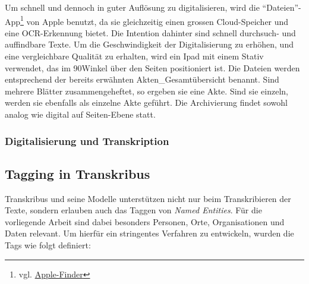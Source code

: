 \documentclass[12pt, a4paper, ngerman, bidi=default]{article}
\begin{document}
    Um schnell und dennoch in guter Auflösung zu digitalisieren, wird die \enquote{Dateien}-App\footnote{vgl. \href{https://support.apple.com/de-de/guide/preview/prvw28034/mac}{Apple-Finder}} von 
    Apple benutzt, da sie gleichzeitig einen grossen Cloud-Speicher und eine OCR-Erkennung bietet. Die Intention dahinter sind schnell durchsuch- und auffindbare Texte.
    Um die Geschwindigkeit der Digitalisierung zu erhöhen, und eine vergleichbare Qualität zu erhalten, wird ein Ipad mit einem Stativ verwendet, das im 90\textdegree Winkel über den Seiten positioniert ist. 
    Die Dateien werden entsprechend der bereits erwähnten Akten\_Gesamtübersicht benannt. Sind mehrere Blätter zusammengeheftet, so ergeben sie eine Akte. Sind sie einzeln, werden sie ebenfalls als einzelne Akte geführt. Die Archivierung findet sowohl analog wie digital auf Seiten-Ebene statt.\\
  
    \subsubsection{Digitalisierung und Transkription}
    
    \subsection{Tagging in Transkribus} 

    Transkribus und seine Modelle unterstützen nicht nur beim Transkribieren der Texte, sondern erlauben auch das Taggen von \textit{Named Entities}.  
    Für die vorliegende Arbeit sind dabei besonders Personen, Orte, Organisationen und Daten relevant.  
    Um hierfür ein stringentes Verfahren zu entwickeln, wurden die Tags wie folgt definiert:
    
\end{document}
